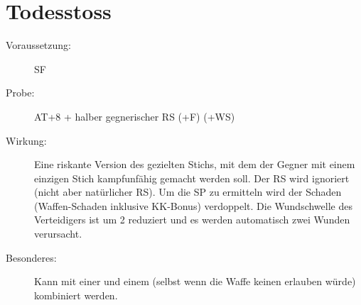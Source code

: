 \section{Todesstoss}
\label{aktion.todesstoss}
\begin{description}
    \item[Voraussetzung:]
        SF 
    \item[Probe:]
        AT+8 + halber gegnerischer RS (+F) (+WS)
    \item[Wirkung:]
        Eine riskante Version des gezielten Stichs, mit dem der Gegner mit einem einzigen Stich kampfunfähig gemacht werden soll.
        Der RS wird ignoriert (nicht aber natürlicher RS).
        Um die SP zu ermitteln wird der Schaden (Waffen-Schaden inklusive KK-Bonus) verdoppelt.
        Die Wundschwelle des Verteidigers ist um 2 reduziert und es werden automatisch zwei Wunden verursacht.
    \item[Besonderes:]
        Kann mit einer  und einem  (selbst wenn die Waffe keinen  erlauben würde) kombiniert werden.
\end{description}
